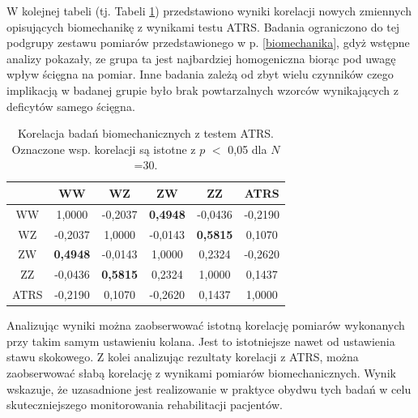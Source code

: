 W kolejnej tabeli (tj. Tabeli \ref{tab:bioVSatrs}) przedstawiono wyniki korelacji nowych zmiennych opisujących biomechanikę z wynikami testu ATRS. Badania ograniczono do tej podgrupy zestawu pomiarów przedstawionego w p. \ref{biomechanika}, gdyż wstępne analizy pokazały, ze grupa ta jest najbardziej homogeniczna biorąc pod uwagę wpływ ścięgna na pomiar. Inne badania zależą od zbyt wielu czynników czego implikacją w badanej grupie było brak powtarzalnych wzorców wynikających z deficytów samego ścięgna.
\vspace{10px}
\begin{table}[h]
	\centering
	\setlength{\tabcolsep}{3pt}
	\setlength\extrarowheight{2pt}
	\caption{Korelacja badań biomechanicznych z testem ATRS. Oznaczone wsp. korelacji są istotne z $p$ $<$ 0,05 dla $N$=30.}
	\label{tab:bioVSatrs}
	\begin{tabular}{c|c|c|c|c|c}
		&WW&WZ&ZW&ZZ&ATRS \\
		\hline \hline
		WW&1,0000&-0,2037&\textbf{0,4948}&-0,0436&-0,2190\\
		\hline
		WZ&-0,2037&1,0000&-0,0143&\textbf{0,5815}&0,1070\\
		\hline
		ZW&\textbf{0,4948}&-0,0143&1,0000&0,2324&-0,2620\\
		\hline
		ZZ&-0,0436&\textbf{0,5815}&0,2324&1,0000&0,1437\\
		\hline
		ATRS&-0,2190&0,1070&-0,2620&0,1437&1,0000\\
		
		
	\end{tabular}
\end{table}

Analizując wyniki można zaobserwować istotną korelację pomiarów wykonanych przy takim samym ustawieniu kolana. Jest to istotniejsze nawet od ustawienia stawu skokowego. Z kolei analizując rezultaty korelacji z ATRS, można zaobserwować słabą korelację z wynikami pomiarów biomechanicznych. Wynik wskazuje, że uzasadnione jest realizowanie w praktyce obydwu tych badań w celu skuteczniejszego monitorowania rehabilitacji pacjentów.

